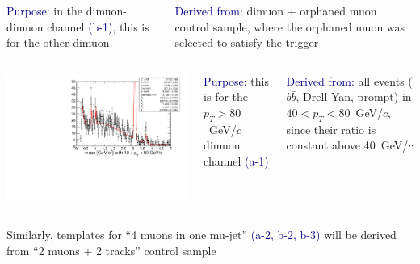 \documentclass[compress]{beamer}
\begin{document}
\begin{frame}
\begin{columns}
\textcolor{darkblue}{Purpose:} in the dimuon-dimuon channel \textcolor{darkblue}{(b-1)}, this is for the other dimuon

\textcolor{darkblue}{Derived from:} dimuon + orphaned muon control sample, where the orphaned muon was selected to satisfy the trigger
\end{columns}

\begin{columns}
\includegraphics[width=\linewidth]{lowdimuon_40-80_backgroundfit_zoom.pdf}

\textcolor{darkblue}{Purpose:} this is for the $p_T > 80$~GeV/$c$ dimuon channel \textcolor{darkblue}{(a-1)}

\textcolor{darkblue}{Derived from:} all events ($b\bar{b}$, Drell-Yan, prompt) in $40 < p_T < 80$~GeV/$c$, since their ratio is constant above 40~GeV/$c$
\end{columns}

Similarly, templates for ``4 muons in one mu-jet'' \textcolor{darkblue}{(a-2, b-2, b-3)} will be derived from ``2 muons + 2 tracks'' control sample
\end{frame}
\end{document}
